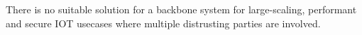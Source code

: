 \documentclass[
    ngerman,american
    ]{scrartcl}
\newcommand{\lang}{en}
\begin{document}
        \begin{description}[style=unboxed]
            \item [\questionOne{\lang}]
                There is no suitable solution for a backbone system for large-scaling, performant and secure IOT usecases where multiple distrusting parties are involved.



\end{description}
\end{document}
